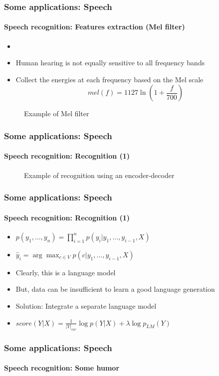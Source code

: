 \documentclass[xcolor=table]{beamer}
\begin{document}
\begin{frame}
	\frametitle{Some applications: Speech}
	\framesubtitle{Speech recognition: Features extraction (Mel filter)}
	\begin{itemize}
		\item {}
		\item Human hearing is not equally sensitive to all frequency bands
		\item Collect the energies at each frequency based on the Mel scale
		\[mel(f) = 1127 \ln (1 + \frac{f}{700})\]
	\end{itemize}
	\begin{figure}
		\centering
		\caption{Example of Mel filter \cite{2020-jurafsky-martin}}
	\end{figure}
\end{frame}

\begin{frame}
	\frametitle{Some applications: Speech}
	\framesubtitle{Speech recognition: Recognition (1)}
	\begin{figure}
		\centering
		\caption{Example of recognition using an encoder-decoder \cite{2020-jurafsky-martin}}
	\end{figure}
\end{frame}

\begin{frame}
	\frametitle{Some applications: Speech}
	\framesubtitle{Speech recognition: Recognition (1)}
	\begin{itemize}
		\item $p(y_1, \ldots, y_n) = \prod\limits_{i=1}^n p(y_i| y_1, \ldots, y_{i-1}, X)$
		
		\item $\hat{y}_i = \arg\max_{c \in V} p(c| y_1, \ldots, y_{i-1}, X)$
		
		\item Clearly, this is a language model
		\item But, data can be insufficient to learn a good language generation
		\item Solution: Integrate a separate language model
		
		\item $score(Y|X) = \frac{1}{|Y|_{car}} \log p(Y|X) + \lambda \log p_{LM}(Y)$
	\end{itemize}
\end{frame}

\begin{frame}
	\frametitle{Some applications: Speech}
	\framesubtitle{Speech recognition: Some humor}
		\begin{center}
		\end{center}
\end{frame}
\end{document}
